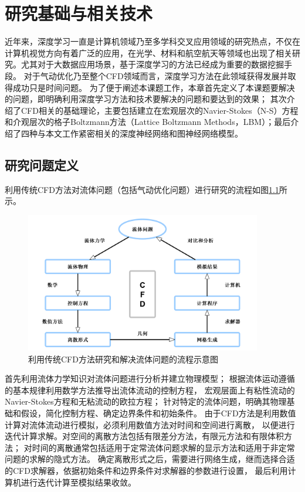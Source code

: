\chapter{研究基础与相关技术}

近年来，深度学习一直是计算机领域乃至多学科交叉应用领域的研究热点，不仅在计算机视觉方向有着广泛的应用，在光学、材料和航空航天等领域也出现了相关研究。尤其对于大数据应用场景，基于深度学习的方法已经成为重要的数据挖掘手段。
对于气动优化乃至整个CFD领域而言，深度学习方法在此领域获得发展并取得成功只是时间问题。
为了便于阐述本课题工作，本章首先定义了本课题要解决的问题，即明确利用深度学习方法和技术要解决的问题和要达到的效果；
其次介绍了CFD相关的基础理论，主要包括建立在宏观层次的Navier-Stokes（N-S）方程和介观层次的格子Boltzmann方法（Lattice Boltzmann Methods，LBM）；最后介绍了四种与本文工作紧密相关的深度神经网络和图神经网络模型。

\section{研究问题定义}
利用传统CFD方法对流体问题（包括气动优化问题）进行研究的流程如图\ref{fig:cfdflow}所示。
\begin{figure}[htp]
	\centering
	\includegraphics[width=0.92\textwidth]{figures/cfdflow.pdf}
	\caption{利用传统CFD方法研究和解决流体问题的流程示意图}
	\label{fig:cfdflow}
\end{figure}


首先利用流体力学知识对流体问题进行分析并建立物理模型；
根据流体运动遵循的基本规律利用数学方法推导出流体流动的控制方程，
宏观层面上有粘性流动的Navier-Stokes方程和无粘流动的欧拉方程；
针对特定的流体问题，明确其物理基础和假设，简化控制方程、确定边界条件和初始条件。
由于CFD方法是利用数值计算对流体流动进行模拟，必须利用数值方法对时间和空间进行离散，
以便进行迭代计算求解。对空间的离散方法包括有限差分方法\cite{Forsythe1960Finite}，有限元方法\cite{Strang1974An}和有限体积方法\cite{Eymard2000The}；
对时间的离散通常包括适用于定常流体问题求解的显示方法和适用于非定常问题的求解的隐式方法。
确定离散形式之后，需要进行网络生成，继而选择合适的CFD求解器，依据初始条件和边界条件对求解器的参数进行设置，
最后利用计算机进行迭代计算至模拟结果收敛。



